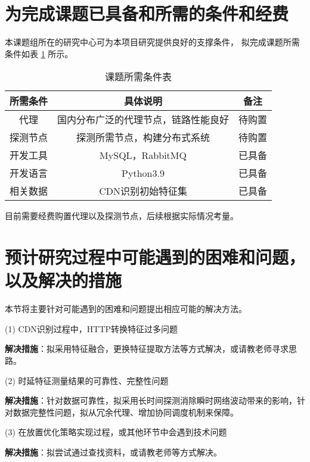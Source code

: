 
\section{为完成课题已具备和所需的条件和经费}
本课题组所在的研究中心可为本项目研究提供良好的支撑条件，
拟完成课题所需条件如表 \ref{table:课题所需条件表} 所示。

\begin{table}[htbp]
	\centering
	\caption{课题所需条件表}\label{table:课题所需条件表}
	\vspace{0.5em}\wuhao
	\begin{tabular}{ccc}
		\toprule
		所需条件        & 具体说明     & 备注    \\
		\midrule
		代理           & 国内分布广泛的代理节点，链路性能良好           & 待购置      \\
		探测节点          & 探测所需节点，构建分布式系统  & 待购置  \\
		开发工具         & MySQL，RabbitMQ   & 已具备 \\
		开发语言           & Python3.9  & 已具备 \\
		相关数据          & CDN识别初始特征集 &     已具备     \\


		\bottomrule
	\end{tabular}
\end{table}

目前需要经费购置代理以及探测节点，后续根据实际情况考量。

\section{预计研究过程中可能遇到的困难和问题，以及解决的措施}
本节将主要针对可能遇到的困难和问题提出相应可能的解决方法。

(1) CDN识别过程中，HTTP转换特征过多问题

\textbf{解决措施}：拟采用特征融合，更换特征提取方法等方式解决，或请教老师寻求思路。

(2) 时延特征测量结果的可靠性、完整性问题

\textbf{解决措施}：针对数据可靠性，拟采用长时间探测消除瞬时网络波动带来的影响，针对数据完整性问题，拟从冗余代理、增加协同调度机制来保障。

(3) 在放置优化策略实现过程，或其他环节中会遇到技术问题

\textbf{解决措施}：拟尝试通过查找资料，或请教老师等方式解决。


